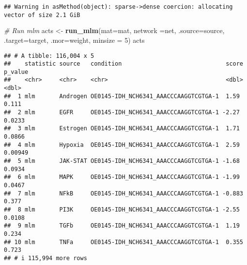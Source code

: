 \documentclass[
]{article}
\newenvironment{Shaded}{\begin{snugshade}}{\end{snugshade}}
\newcommand{\AttributeTok}[1]{\textcolor[rgb]{0.13,0.29,0.53}{#1}}
\newcommand{\CommentTok}[1]{\textcolor[rgb]{0.56,0.35,0.01}{\textit{#1}}}
\newcommand{\DecValTok}[1]{\textcolor[rgb]{0.00,0.00,0.81}{#1}}
\newcommand{\FunctionTok}[1]{\textcolor[rgb]{0.13,0.29,0.53}{\textbf{#1}}}
\newcommand{\NormalTok}[1]{#1}
\newcommand{\OtherTok}[1]{\textcolor[rgb]{0.56,0.35,0.01}{#1}}
\newcommand{\StringTok}[1]{\textcolor[rgb]{0.31,0.60,0.02}{#1}}
\begin{document}
\begin{verbatim}
## Warning in asMethod(object): sparse->dense coercion: allocating vector of size 2.1 GiB
\end{verbatim}

\begin{Shaded}
\begin{Highlighting}[]
\CommentTok{\# Run mlm}
\NormalTok{acts }\OtherTok{\textless{}{-}} \FunctionTok{run\_mlm}\NormalTok{(}\AttributeTok{mat=}\NormalTok{mat, }\AttributeTok{network =}\NormalTok{net, }\AttributeTok{.source=}\StringTok{\textquotesingle{}source\textquotesingle{}}\NormalTok{, }\AttributeTok{.target=}\StringTok{\textquotesingle{}target\textquotesingle{}}\NormalTok{,}
                \AttributeTok{.mor=}\StringTok{\textquotesingle{}weight\textquotesingle{}}\NormalTok{, }\AttributeTok{minsize =} \DecValTok{5}\NormalTok{)}
\NormalTok{acts}
\end{Highlighting}
\end{Shaded}

\begin{verbatim}
## # A tibble: 116,004 x 5
##    statistic source   condition                              score p_value
##    <chr>     <chr>    <chr>                                  <dbl>   <dbl>
##  1 mlm       Androgen OE0145-IDH_NCH6341_AAACCCAAGGTCGTGA-1  1.59  0.111  
##  2 mlm       EGFR     OE0145-IDH_NCH6341_AAACCCAAGGTCGTGA-1 -2.27  0.0233 
##  3 mlm       Estrogen OE0145-IDH_NCH6341_AAACCCAAGGTCGTGA-1  1.71  0.0866 
##  4 mlm       Hypoxia  OE0145-IDH_NCH6341_AAACCCAAGGTCGTGA-1  2.59  0.00949
##  5 mlm       JAK-STAT OE0145-IDH_NCH6341_AAACCCAAGGTCGTGA-1 -1.68  0.0934 
##  6 mlm       MAPK     OE0145-IDH_NCH6341_AAACCCAAGGTCGTGA-1 -1.99  0.0467 
##  7 mlm       NFkB     OE0145-IDH_NCH6341_AAACCCAAGGTCGTGA-1 -0.883 0.377  
##  8 mlm       PI3K     OE0145-IDH_NCH6341_AAACCCAAGGTCGTGA-1 -2.55  0.0108 
##  9 mlm       TGFb     OE0145-IDH_NCH6341_AAACCCAAGGTCGTGA-1  1.19  0.234  
## 10 mlm       TNFa     OE0145-IDH_NCH6341_AAACCCAAGGTCGTGA-1  0.355 0.723  
## # i 115,994 more rows
\end{verbatim}
\end{document}

